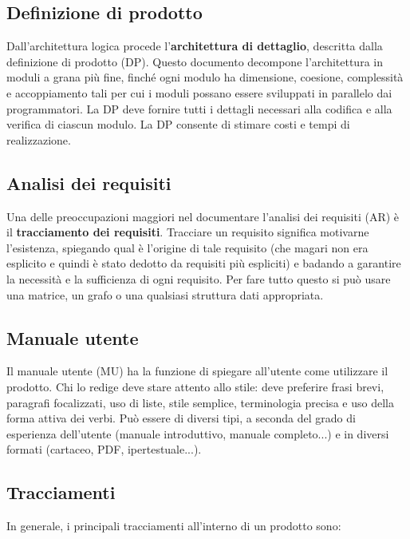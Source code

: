 \documentclass[a4paper]{article}
\begin{document}
		
	\subsection{Definizione di prodotto}

		
Dall'architettura logica procede l'\textbf{architettura di dettaglio}, descritta dalla definizione di prodotto (DP). Questo documento decompone l'architettura in moduli a grana più fine, finché ogni modulo ha dimensione, coesione, complessità e accoppiamento tali per cui i moduli possano essere sviluppati in parallelo dai programmatori. La DP deve fornire tutti i dettagli necessari alla codifica e alla verifica di ciascun modulo. La DP consente di stimare costi e tempi di realizzazione.

		
	\subsection{Analisi dei requisiti}

		
Una delle preoccupazioni maggiori nel documentare l'analisi dei requisiti (AR) è il \textbf{tracciamento dei requisiti}. Tracciare un requisito significa motivarne l'esistenza, spiegando qual è l'origine di tale requisito (che magari non era esplicito e quindi è stato dedotto da requisiti più espliciti) e badando a garantire la necessità e la sufficienza di ogni requisito. Per fare tutto questo si può usare una matrice, un grafo o una qualsiasi struttura dati appropriata.

		
	\subsection{Manuale utente}

		
Il manuale utente (MU) ha la funzione di spiegare all'utente come utilizzare il prodotto. Chi lo redige deve stare attento allo stile: deve preferire frasi brevi, paragrafi focalizzati, uso di liste, stile semplice, terminologia precisa e uso della forma attiva dei verbi. Può essere di diversi tipi, a seconda del grado di esperienza dell'utente (manuale introduttivo, manuale completo...) e in diversi formati (cartaceo, PDF, ipertestuale...).

		
	\subsection{Tracciamenti}

		
In generale, i principali tracciamenti all'interno di un prodotto sono:
		
\end{document}
